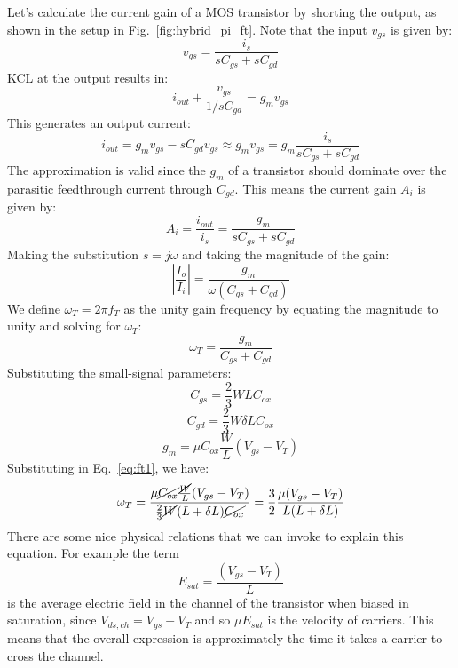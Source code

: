 Let's calculate the current gain of a MOS transistor by shorting the output, as shown in the setup in Fig.~\ref{fig:hybrid_pi_ft}.  Note that the input $v_{gs}$ is given by:
\begin{equation}
	{v_{gs}} = \frac{{{i_s}}}{{s{C_{gs}} + s{C_{gd}}}}
\end{equation}
KCL at the output results in:
\begin{equation} 
	{i_{out}} + \frac{{{v_{gs}}}}{{1/s{C_{gd}}}} = {g_m}{v_{gs}} 
\end{equation}
This generates an output current:
\begin{equation} 
	{i_{out}} = {g_m}{v_{gs}} - s{C_{gd}}{v_{gs}} \approx {g_m}{v_{gs}} = {g_m}\frac{{{i_s}}}{{s{C_{gs}} + s{C_{gd}}}}
\end{equation}
The approximation is valid since the $g_m$ of a transistor should dominate over the parasitic feedthrough current through $C_{gd}$.  This means the current gain $A_i$ is given by:
\begin{equation} 
	{A_i} = \frac{{{i_{out}}}}{{{i_s}}} = \frac{{{g_m}}}{{s{C_{gs}} + s{C_{gd}}}} 
\end{equation}
Making the substitution $s = j\omega$ and taking the magnitude of the gain:
\begin{equation} 
	\left| {\frac{{{I_o}}}{{{I_i}}}} \right| = \frac{{{g_m}}}{{\omega ({C_{gs}} + {C_{gd}})}} 
\end{equation}
We define $\omega_T = 2\pi f_T$ as the unity gain frequency by equating the magnitude to unity and solving for $\omega_T$:
\begin{equation} 
	{\omega _T} = \frac{{{g_m}}}{{{C_{gs}} + {C_{gd}}}}   \label{eq:ft1}
\end{equation}
Substituting the small-signal parameters:
\begin{equation}
	C_{gs} = \frac{2}{3} W L C_{ox}
\end{equation}
\begin{equation}
	C_{gd} = \frac{2}{3} W \delta L C_{ox}
\end{equation}
\begin{equation}
	g_m = \mu C_{ox} \frac{W}{L} (V_{gs} - V_T)
\end{equation}
Substituting in Eq.~\ref{eq:ft1}, we have:
\begin{equation} 
	{\omega _T} = \frac{\mu \cancel{C_{ox}} \frac{\cancel{W}}{L} (V_{gs} - V_T)}
				 {\frac{2}{3} \cancel{W} (L + \delta L) \cancel{C_{ox}}} =
				 \frac{3}{2} \frac{\mu (V_{gs} - V_T)}
				 	{L(L+\delta L)}  \label{eq:ft2}
\end{equation}
There are some nice physical relations that we can invoke to explain this equation.  For example the term
\begin{equation}
	E_{sat} = \frac{(V_{gs} - V_T)}{L}
\end{equation}
is the average electric field in the channel of the transistor when biased in saturation, since $V_{ds,ch} = V_{gs} - V_T$ and so $\mu E_{sat}$ is the velocity of carriers.  This means that the overall expression is approximately the time it takes a carrier to cross the channel.  

